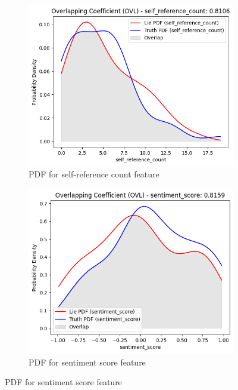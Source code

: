 \documentclass[12pt]{article}
\begin{document}
\begin{figure}
    \ContinuedFloat
    \begin{subfigure}{0.5\textwidth}
        \includegraphics[width=\textwidth]{Figures/self_reference_count.png}
        \caption{PDF for self-reference count feature}
        \label{fig:7}
    \end{subfigure}%
    \begin{subfigure}{0.5\textwidth}
        \includegraphics[width=\textwidth]{Figures/sentiment_score.png}
        \caption{PDF for sentiment score feature}
        \label{fig:8}
    \end{subfigure}


\end{figure}
\end{document}
